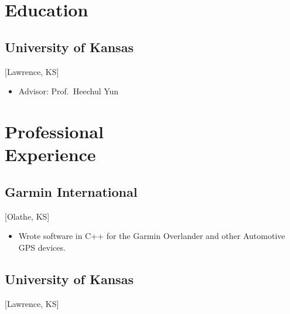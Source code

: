 \documentclass{mycv}
\begin{document}
\maketitle%

\section{Education}

\subsection{University of Kansas}[Lawrence, KS]
\begin{positions}
\end{positions}
\vspace{-\parskip}%
\begin{itemize}[label={}]
    \item Advisor: {Prof.~Heechul Yun}
\end{itemize}

\begin{positions}
\end{positions}
\vspace{-\parskip}%

\section{Professional \\ Experience}

\subsection{Garmin International}[Olathe, KS]
\begin{positions}
\end{positions}

\begin{itemize}
    \item Wrote software in C++ for the Garmin Overlander and other Automotive GPS devices.
\end{itemize}

\subsection{University of Kansas}[Lawrence, KS]
\begin{positions}
\end{positions}
\end{document}
